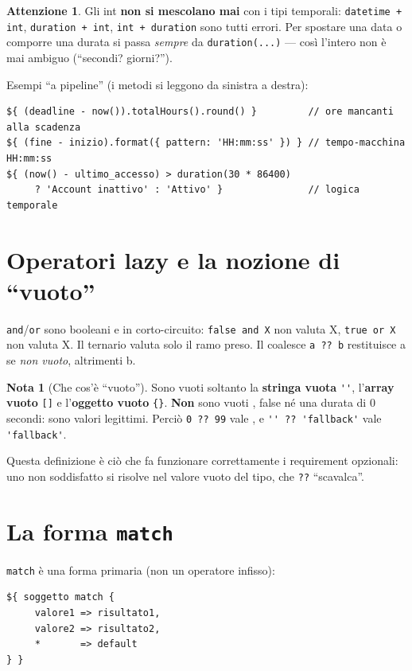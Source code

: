 \documentclass[11pt,a4paper]{book}
\let\code\lstinline
\newcommand{\ic}[1]{{\ttfamily #1}}
\theoremstyle{definition}
\newtheorem*{nota}{Nota}
\newtheorem*{attenzione}{Attenzione}
\begin{document}
{{{{\begin{attenzione}
Gli \ic{int} \textbf{non si mescolano mai} con i tipi temporali:
\code|datetime + int|, \code|duration + int|, \code|int + duration| sono tutti
errori. Per spostare una data o comporre una durata si passa \emph{sempre} da
\code|duration(...)| --- così l'intero non è mai ambiguo (``secondi? giorni?'').
\end{attenzione}

Esempi ``a pipeline'' (i metodi si leggono da sinistra a destra):

\begin{lstlisting}
${ (deadline - now()).totalHours().round() }         // ore mancanti alla scadenza
${ (fine - inizio).format({ pattern: 'HH:mm:ss' }) } // tempo-macchina HH:mm:ss
${ (now() - ultimo_accesso) > duration(30 * 86400)
     ? 'Account inattivo' : 'Attivo' }               // logica temporale
\end{lstlisting}

\section{Operatori lazy e la nozione di ``vuoto''}

\code|and|/\code|or| sono booleani e in corto-circuito: \code|false and X| non
valuta \ic{X}, \code|true or X| non valuta \ic{X}. Il ternario valuta solo il ramo
preso. Il coalesce \code|a ?? b| restituisce \ic{a} se \emph{non vuoto}, altrimenti
\ic{b}.

\begin{nota}[Che cos'è ``vuoto'']
Sono vuoti soltanto la \textbf{stringa vuota} \code|''|, l'\textbf{array vuoto}
\code|[]| e l'\textbf{oggetto vuoto} \verb|{}|. \textbf{Non} sono vuoti \ic{0},
\ic{false} né una durata di 0 secondi: sono valori legittimi. Perciò
\code|0 ?? 99| vale \ic{0}, e \code|'' ?? 'fallback'| vale \code|'fallback'|.
\end{nota}

Questa definizione è ciò che fa funzionare correttamente i requirement opzionali:
uno non soddisfatto si risolve nel valore vuoto del tipo, che \code|??| ``scavalca''.

\section{La forma \texttt{match}}

\code|match| è una forma primaria (non un operatore infisso):

\begin{lstlisting}
${ soggetto match {
     valore1 => risultato1,
     valore2 => risultato2,
     *       => default
} }
\end{lstlisting}

}}}}
\end{document}
